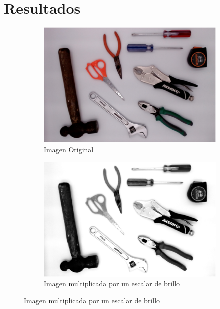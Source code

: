 \documentclass[a4paper, 11pt]{article}
\begin{document}
\newpage
\section{Resultados}

\begin{figure}[h]
  \centering
  \begin{subfigure}{0.5\linewidth}
    \includegraphics[width=\linewidth]{paso1} 
    \caption{Imagen Original}
    \label{fig:1a}
  \end{subfigure}\hfill
  \begin{subfigure}{0.5\linewidth}
    \includegraphics[width=\linewidth]{paso2}
    \caption{Imagen multiplicada por un escalar de brillo}
    \label{fig:1a}
  \end{subfigure}
  

\end{figure}
\end{document}
